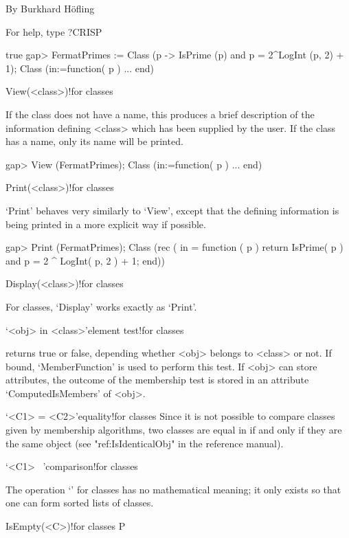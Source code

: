                 By Burkhard H\"ofling               
                                                    
                For help, type ?CRISP               
                                                    
true
gap> FermatPrimes := Class (p -> IsPrime (p) and p = 2^LogInt (p, 2) + 1); 
Class (in:=function( p ) ... end)
\endexample

\>View(<class>)!{for classes}

If the class does not have a name, this produces a brief description of the
information defining <class> which has been supplied by the user. If the
class has a name, only its name will be printed.

\begintt
gap> View (FermatPrimes);
Class (in:=function( p ) ... end)
\endtt

\>Print(<class>)!{for classes}

`Print' behaves very similarly to `View', except that the defining
information is being printed in a more explicit way if possible.

\begintt
gap> Print (FermatPrimes);
Class (rec ( in = function ( p )
    return IsPrime( p ) and p = 2 ^ LogInt( p, 2 ) + 1;
end))
\endtt


\>Display(<class>)!{for classes}

For classes, `Display' works exactly as `Print'.

\>`<obj> in <class>'{element test}!{for classes}

%
%
returns true or false, depending whether <obj> belongs to <class> or not. If
bound, `MemberFunction' is used to perform this test. If <obj> can store
attributes, the outcome of the membership test is stored in an attribute
`ComputedIsMembers' of <obj>.

\>`<C1> = <C2>'{equality!for classes}
Since it is not possible to compare classes given by membership algorithms,
two classes are equal in {\GAP} if and only if they are the same {\GAP}
object (see "ref:IsIdenticalObj" in the {\GAP} reference manual).

\>`<C1> \<\ <C2>'{comparison!for classes}

The operation `\<' for classes has no mathematical meaning; it only exists
so that one can form sorted lists of classes.



\>IsEmpty(<C>)!{for classes} P

